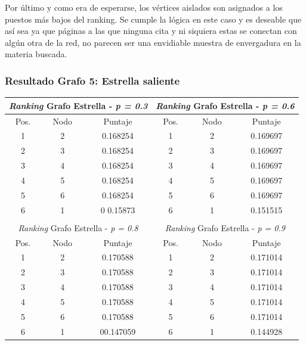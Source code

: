 Por último y como era de esperarse, los vértices aislados son asignados a los puestos más bajos del ranking. Se cumple la lógica en este caso y es deseable que así sea ya que páginas a las que ninguna cita y ni siquiera estas se conectan con algún otra de la red, no parecen ser una envidiable muestra de envergadura en la materia buscada.\\ 
  
            
\subsubsection{Resultado Grafo 5: Estrella saliente} 

\begin{center}
         \begin{tabular}{|c|c|c||c|c|c|}
                    \hline
                    \multicolumn{3}{|c||}{\emph{Ranking} Grafo Estrella - \emph{p = 0.3}} & \multicolumn{3}{c|}{\emph{Ranking} Grafo Estrella - \emph{p = 0.6}} \\ \hline
                    Pos. & Nodo & Puntaje    & Pos. & Nodo & Puntaje  \\ \hline
1 & 2 & 0.168254 & 1 & 2 & 0.169697 \\ 
2 & 3 & 0.168254 & 2 & 3 & 0.169697 \\
3 & 4 & 0.168254  & 3 & 4 & 0.169697 \\
4 & 5 & 0.168254  & 4 & 5 & 0.169697 \\
5 &  6 & 0.168254 & 5 & 6 &  0.169697 \\
6 & 1 & 0 0.15873 & 6 & 1 &  0.151515 \\ \hline
                    \multicolumn{6}{c}{} \\ \hline
                    \multicolumn{3}{|c||}{\emph{Ranking} Grafo Estrella - \emph{p = 0.8}} & \multicolumn{3}{c|}{\emph{Ranking} Grafo Estrella - \emph{p = 0.9}} \\ \hline
                    Pos. & Nodo & Puntaje    & Pos. & Nodo & Puntaje  \\ \hline
1 & 2 & 0.170588 & 1 & 2 & 0.171014 \\ 
2 & 3 & 0.170588 & 2 & 3 & 0.171014 \\
3 & 4 & 0.170588  & 3 & 4 & 0.171014 \\
4 & 5 & 0.170588  & 4 & 5 & 0.171014 \\
5 &  6 & 0.170588 & 5 & 6 &  0.171014 \\
6 & 1 & 00.147059 & 6 & 1 &  0.144928 \\ \hline

                \end{tabular}
            \end{center}
            
